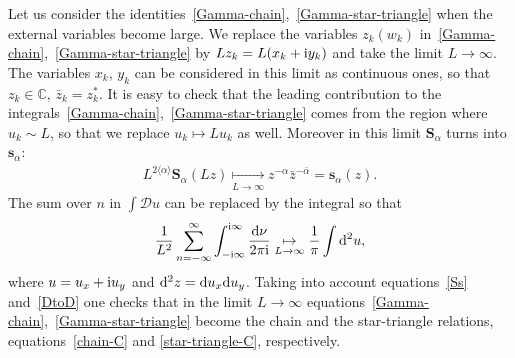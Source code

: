 \documentclass[pdftex]{sigma}
\numberwithin{equation}{section}
\begin{document}
Let us consider the identities~\eqref{Gamma-chain},~\eqref{Gamma-star-triangle} when the external variables become large. We replace the variables $z_k (w_k)$ in~\eqref{Gamma-chain},~\eqref{Gamma-star-triangle} by $L z_k=L(x_k+{\rm i}y_k)$ and take the limit $L\to\infty$. The variables $x_k$, $y_k$ can be considered in this limit as continuous ones, so that $z_k\in \mathbb C$, $\bar z_k=z_k^*$. It is easy to check that the leading contribution to the integrals~\eqref{Gamma-chain},~\eqref{Gamma-star-triangle} comes from the region where $u_k\sim L$, so that we replace $u_k\mapsto L u_k$ as well. Moreover in this limit $\boldsymbol S_\alpha$ turns into $\boldsymbol s_\alpha$:
\begin{gather}\label{Ss}
L^{2\langle\alpha\rangle}\boldsymbol S_\alpha(Lz) \underset{L\to\infty}{\mapsto} z^{-\alpha}\bar z^{-\bar\alpha} =\boldsymbol s_\alpha(z).
\end{gather}
The sum over $n$ in $\int \mathcal D u$ can be replaced by the integral so that
\begin{gather}\label{DtoD}
\frac1{L^2}\sum_{n=-\infty}^\infty \int_{-{\rm i}\infty}^{{\rm i}\infty} \frac{{\rm d} \nu}{2\pi {\rm i}} \underset{L\to\infty}{\mapsto} \frac1\pi \int {\rm d}^2 u,
\end{gather}
where $u=u_x+{\rm i}u_y$ and ${\rm d}^2z ={\rm d}u_x{\rm d}u_y$. Taking into account equations~\eqref{Ss} and~\eqref{DtoD} one checks that in the limit $L\to\infty$ equations~\eqref{Gamma-chain},~\eqref{Gamma-star-triangle} become the chain and the star-triangle relations, equations~\eqref{chain-C} and \eqref{star-triangle-C}, respectively.
\end{document}
